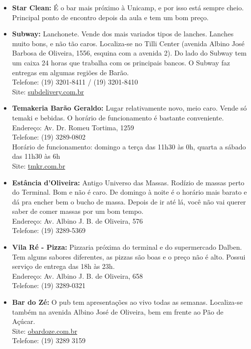 \begin{itemize}
    \item   \textbf{Star Clean:} É o bar mais próximo à Unicamp, e por isso está
        sempre cheio. Principal ponto de encontro depois da aula e tem um bom
        preço.

    \item   \textbf{Subway:} Lanchonete. Vende dos mais variados tipos de
        lanches.  Lanches muito bons, e não tão caros. Localiza-se no Tilli
        Center (avenida Albino José Barbosa de Oliveira, 1556, esquina com a
        avenida 2). Do lado do Subway tem um caixa 24 horas que trabalha com os
        principais bancos. O Subway faz entregas em algumas regiões de Barão.
        \\Telefone: (19) 3201-8411 / (19) 3201-8410
        \\Site: \url{subdelivery.com.br}

      \item \textbf{Temakeria Barão Geraldo:} Lugar relativamente novo, meio
        caro. Vende só temaki e bebidas. O horário de funcionamento é bastante
        conveniente.  
        \\Endereço: Av. Dr. Romeu Tortima, 1259 
        \\Telefone: (19) 3289-0802 
        \\Horário de funcionamento: domingo a terça das 11h30 às 0h, quarta a
        sábado das 11h30 às 6h 
        \\Site: \url{tmkr.com.br}

    \item   \textbf{Estância d'Oliveira:} Antigo Universo das Massas. Rodízio de
        massas perto do Terminal. Bom e não é caro. De domingo à noite é o
        horário mais barato e dá pra encher bem o bucho de massa. Depois de ir
        até lá, você não vai querer saber de comer massas por um bom tempo.
        \\Endereço: Av. Albino J. B. de Oliveira, 576
        \\Telefone: (19) 3289-5369 

    \item   \textbf{Vila Ré - Pizza:} Pizzaria próxima do terminal e do
        supermercado Dalben. Tem alguns sabores diferentes, as pizzas são boas e
        o preço não é alto. Possui serviço de entrega das 18h às 23h.
        \\Endereço: Av. Albino J. B. de Oliveira, 658
        \\Telefone: (19) 3289-0321

    \item   \textbf{Bar do Zé:} O pub tem apresentações ao vivo todas as
        semanas.  Localiza-se também na avenida Albino José de Oliveira, bem em
        frente ao Pão de Açúcar.
        \\Site: \url{obardoze.com.br}
        \\Telefone: (19) 3289 3159


\end{itemize}
